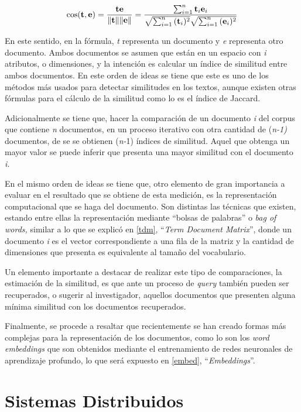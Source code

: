 \documentclass[
  12pt,
  openany]{book}
\begin{document}
\begin{equation}
\cos ({\bf t},{\bf e})= {{\bf t} {\bf e} \over \|{\bf t}\| \|{\bf e}\|} = \frac{ \sum_{i=1}^{n}{{\bf t}_i{\bf e}_i} }{ \sqrt{\sum_{i=1}^{n}{({\bf t}_i)^2}} \sqrt{\sum_{i=1}^{n}{({\bf e}_i)^2}} }
\end{equation}

En este sentido, en la fórmula, \emph{t} representa un documento y \emph{e} representa otro documento. Ambos documentos se asumen que están en un espacio con \emph{i} atributos, o dimensiones, y la intención es calcular un índice de similitud entre ambos documentos. En este orden de ideas se tiene que este es uno de los métodos más usados para detectar similitudes en los textos, aunque existen otras fórmulas para el cálculo de la similitud como lo es el índice de Jaccard.

Adicionalmente se tiene que, hacer la comparación de un documento \emph{i} del corpus que contiene \emph{n} documentos, en un proceso iterativo con otra cantidad de (\emph{n-1)} documentos, de se se obtienen (\emph{n-}1) índices de similitud. Aquel que obtenga un mayor valor se puede inferir que presenta una mayor similitud con el documento \emph{i.}

En el mismo orden de ideas se tiene que, otro elemento de gran importancia a evaluar en el resultado que se obtiene de esta medición, es la representación computacional que se haga del documento. Son distintas las técnicas que existen, estando entre ellas la representación mediante ``bolsas de palabras'' o \emph{bag of words,} similar a lo que se explicó en \ref{tdm}, ``\emph{Term Document Matrix}'', donde un documento \emph{i} es el vector correspondiente a una fila de la matriz y la cantidad de dimensiones que presenta es equivalente al tamaño del vocabulario.

Un elemento importante a destacar de realizar este tipo de comparaciones, la estimación de la similitud, es que ante un proceso de \emph{query} también pueden ser recuperados, o sugerir al investigador, aquellos documentos que presenten alguna mínima similitud con los documentos recuperados.

Finalmente, se procede a resaltar que recientemente se han creado formas más complejas para la representación de los documentos, como lo son los \emph{word embeddings} que son obtenidos mediante el entrenamiento de redes neuronales de aprendizaje profundo, lo que será expuesto en \ref{embed}, ``\emph{Embeddings}''.

\hypertarget{SD}{%
\section{Sistemas Distribuidos}\label{SD}}
\end{document}
